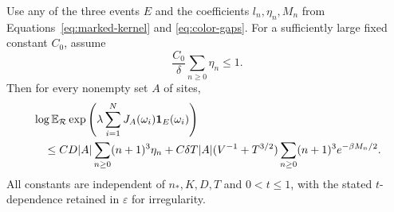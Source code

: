 \begin{proposition}\label{prop:trajectory-moment}
Use any of the three events $E$ and the coefficients
$l_n,\eta_n,M_n$ from Equations~\eqref{eq:marked-kernel}
and \eqref{eq:color-gaps}.  For a sufficiently large
fixed constant $C_0$, assume
\begin{equation}\label{eq:color-smallness}
 \frac{C_0}{\delta}\sum_{n\ge0}\eta_n\le1.
\end{equation}
Then for every nonempty set $A$ of sites,
\begin{align}
 &\log\mathbb E_{\mathcal R}\exp\left(
       \lambda\sum_{i=1}^N J_A(\omega_i)\mathbf 1_E(\omega_i)\right)
 \notag\\
 &\quad\le
 CD|A|\sum_{n\ge0}(n+1)^3\eta_n
 +C\delta T|A|(V^{-1}+T^{3/2})
          \sum_{n\ge0}(n+1)^3e^{-\beta M_n/2}.
 \label{eq:trajectory-moment}
\end{align}
All constants are independent of $n_*,K,D,T$ and
$0<t\le1$, with the stated $t$-dependence retained in
$\varepsilon$ for irregularity.
\end{proposition}

